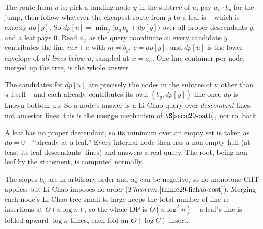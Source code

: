The route from \(u\) is: pick a landing node \(y\) in the subtree of \(u\), pay \(a_u\cdot b_y\) for
the jump, then follow whatever the cheapest route from \(y\) to a leaf is -- which is exactly
\(\mathit{dp}[y]\). So \(\mathit{dp}[u]=\min_{y}\big(a_u\, b_y + \mathit{dp}[y]\big)\) over all
proper descendants \(y\), and a leaf pays \(0\). Read \(a_u\) as the query coordinate \(x\): every
candidate \(y\) contributes the line \(m x + c\) with \(m=b_y\), \(c=\mathit{dp}[y]\), and
\(\mathit{dp}[u]\) is the lower envelope of \emph{all lines below \(u\)}, sampled at \(x=a_u\). One
line container per node, merged up the tree, is the whole answer.

\begin{observation}
The candidates for \(\mathit{dp}[u]\) are precisely the nodes in the subtree of \(u\) other than
\(u\) itself -- and each already contributes its own \((b_y,\mathit{dp}[y])\) line once \(\mathit{dp}\)
is known bottom-up. So a node's answer is a Li Chao query over \emph{descendant} lines, not ancestor
lines: this is the \textbf{merge} mechanism of \(\secref{c29-path}\), not rollback.
\end{observation}
\begin{observation}
A leaf has no proper descendant, so its minimum over an empty set is taken as \(\mathit{dp}=0\) --
``already at a leaf.'' Every internal node then has a non-empty hull (at least its leaf
descendants' lines) and answers a real query. The root, being non-leaf by the statement, is computed
normally.
\end{observation}
\begin{observation}
The slopes \(b_y\) are in arbitrary order and \(a_u\) can be negative, so no monotone CHT applies;
but Li Chao imposes no order (\(\thmref{c29-lichao-cost}\)). Merging each node's Li Chao tree
small-to-large keeps the total number of line re-insertions at \(O(n\log n)\), so the whole DP is
\(O(n\log^2 n)\) -- a leaf's line is folded upward \(\log n\) times, each fold an \(O(\log C)\) insert.
\end{observation}

